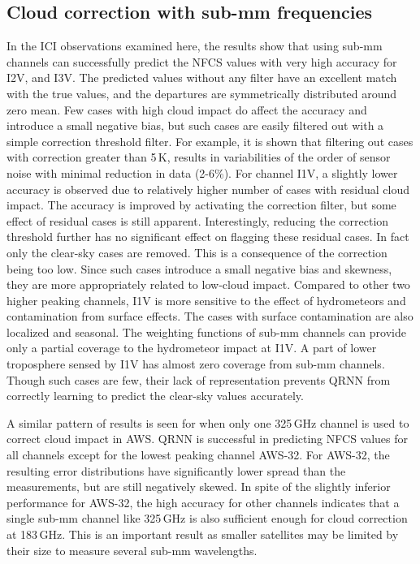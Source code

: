 \documentclass[amt, manuscript]{copernicus}
\begin{document}
\subsection{Cloud correction with sub-mm frequencies }
%
In the ICI observations examined here, the results show that using sub-mm channels can successfully predict the NFCS values with very high accuracy for I2V, and I3V. The predicted values without any filter have an excellent match with the true values, and the departures are symmetrically distributed around zero mean. Few cases with high cloud impact do affect the accuracy and introduce a small negative bias, but such cases are easily filtered out with a simple correction threshold filter. For example, it is shown that filtering out cases with correction greater than 5\,K, results in variabilities of the order of sensor noise with minimal reduction in data (2-6\%). For channel I1V, a slightly lower accuracy is observed due to relatively higher number of cases with residual cloud impact. The accuracy is improved by activating the correction filter, but some effect of residual cases is still apparent. Interestingly, reducing the correction threshold further has no significant effect on flagging these residual cases. In fact only the clear-sky cases are removed. This is a consequence of the correction being too low. Since such cases introduce a small negative bias and skewness, they are more appropriately related to low-cloud impact. Compared to other two higher peaking channels, I1V is more sensitive to the effect of hydrometeors  and contamination from surface effects. The cases with surface contamination are also localized and seasonal. The weighting functions of sub-mm channels can provide only a partial coverage to the hydrometeor impact at I1V. A part of lower troposphere sensed by I1V has almost zero coverage from sub-mm channels. Though such cases are few, their lack of representation prevents QRNN from correctly learning to predict the clear-sky values accurately.

A similar pattern of results is seen for when only one 325\,GHz channel is used to correct cloud impact in AWS. QRNN is successful in predicting NFCS values for all channels except for the lowest peaking channel AWS-32. For AWS-32, the resulting error distributions have significantly lower spread than the measurements, but are still negatively skewed. In spite of the slightly inferior performance for AWS-32, the high accuracy for other channels indicates that a single sub-mm channel like 325\,GHz is also sufficient enough for cloud correction at 183\,GHz. This is an important result as smaller satellites may be limited by their size to measure several sub-mm wavelengths.
\end{document}
